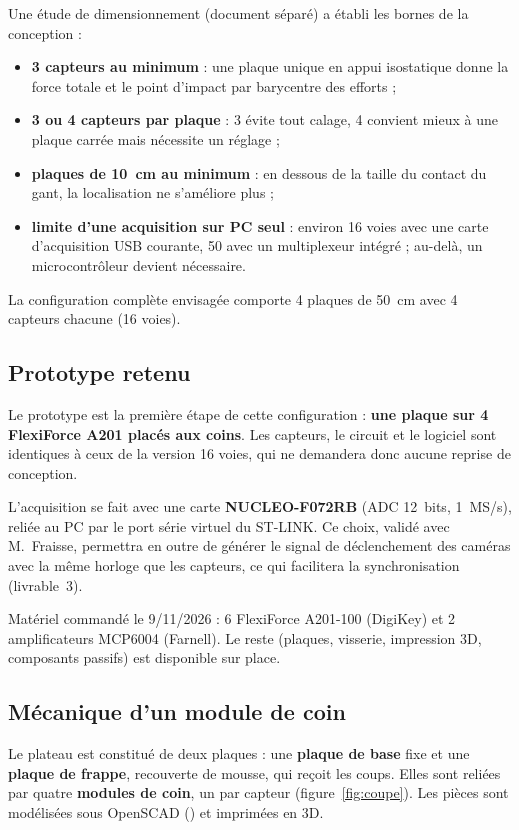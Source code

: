 Une étude de dimensionnement (document séparé) a établi les bornes de la conception :
\begin{itemize}
  \item \textbf{3 capteurs au minimum} : une plaque unique en appui isostatique donne la force totale et le point d'impact par barycentre des efforts ;
  \item \textbf{3 ou 4 capteurs par plaque} : 3 évite tout calage, 4 convient mieux à une plaque carrée mais nécessite un réglage ;
  \item \textbf{plaques de 10~cm au minimum} : en dessous de la taille du contact du gant, la localisation ne s'améliore plus ;
  \item \textbf{limite d'une acquisition sur PC seul} : environ 16 voies avec une carte d'acquisition USB courante, 50 avec un multiplexeur intégré ; au-delà, un microcontrôleur devient nécessaire.
\end{itemize}

La configuration complète envisagée comporte 4 plaques de 50~cm avec 4 capteurs chacune (16 voies).

\subsection{Prototype retenu}

Le prototype est la première étape de cette configuration : \textbf{une plaque sur 4 FlexiForce A201 placés aux coins}. Les capteurs, le circuit et le logiciel sont identiques à ceux de la version 16 voies, qui ne demandera donc aucune reprise de conception.

L'acquisition se fait avec une carte \textbf{NUCLEO-F072RB} (ADC 12~bits, 1~MS/s), reliée au PC par le port série virtuel du ST-LINK. Ce choix, validé avec M.~Fraisse, permettra en outre de générer le signal de déclenchement des caméras avec la même horloge que les capteurs, ce qui facilitera la synchronisation (livrable~3).

Matériel commandé le 9/11/2026 : 6 FlexiForce A201-100 (DigiKey) et 2 amplificateurs MCP6004 (Farnell). Le reste (plaques, visserie, impression 3D, composants passifs) est disponible sur place.

\subsection{Mécanique d'un module de coin}
\label{sec:meca}

Le plateau est constitué de deux plaques : une \textbf{plaque de base} fixe et une \textbf{plaque de frappe}, recouverte de mousse, qui reçoit les coups. Elles sont reliées par quatre \textbf{modules de coin}, un par capteur (figure~\ref{fig:coupe}). Les pièces sont modélisées sous OpenSCAD () et imprimées en 3D.

